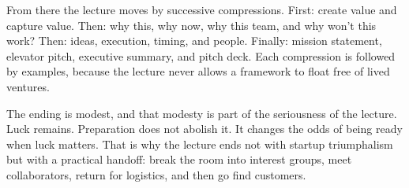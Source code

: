 From there the lecture moves by successive compressions. First: create value and capture value. Then: why this, why now, why this team, and why won't this work? Then: ideas, execution, timing, and people. Finally: mission statement, elevator pitch, executive summary, and pitch deck. Each compression is followed by examples, because the lecture never allows a framework to float free of lived ventures.

The ending is modest, and that modesty is part of the seriousness of the lecture. Luck remains. Preparation does not abolish it. It changes the odds of being ready when luck matters. That is why the lecture ends not with startup triumphalism but with a practical handoff: break the room into interest groups, meet collaborators, return for logistics, and then go find customers.